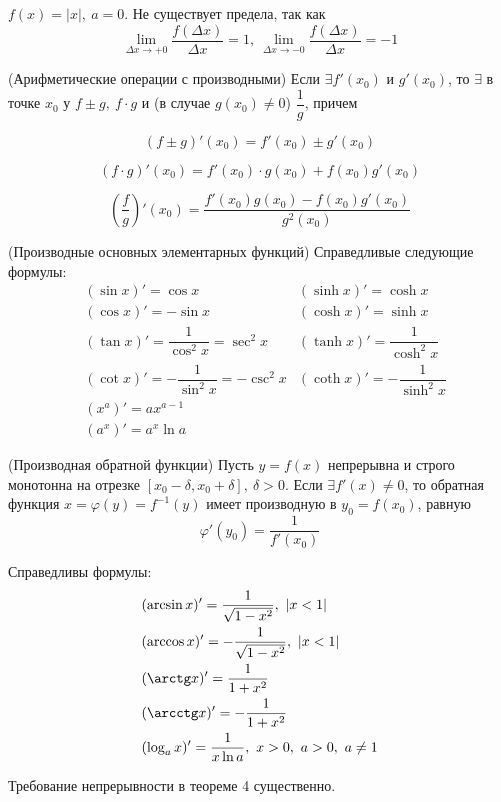 \begin{multicols}{2}
    \Ex $f(x) = |x|,\ a = 0$. Не существует предела, так как 
    \[
        \lim\limits_{\Delta x \to +0} \dfrac{f(\Delta x)}{\Delta x} = 1,\ \lim\limits_{\Delta x \to -0}\dfrac{f(\Delta x)}{\Delta x} = -1
    \]
    \begin{theorema}{(Арифметические операции с производными)}{} 
        Если $\exists f'(x_0)$ и  $g'(x_0)$, то $\exists$ в точке $x_0$ у $f\pm g,\ f\cdot g$ и (в случае $g(x_0) \neq 0$) $\dfrac{1}{g}$, причем 
        \begin{enumerate*}
            \item \[(f\pm g)'(x_0) = f'(x_0) \pm g'(x_0)\]
            \item \[(f\cdot g)'(x_0) = f'(x_0)\cdot g(x_0) + f(x_0)g'(x_0)\]
            \item \[(\dfrac{f}{g})'(x_0) = \dfrac{f'(x_0)g(x_0) - f(x_0)g'(x_0)}{g^2(x_0)}\]
        \end{enumerate*}
    \end{theorema}
    \begin{theorema}{(Производные основных элементарных функций)}{} 
        Справедливые следующие формулы:
        \begin{align*}
            &(\sin x)' = \cos x &(\sinh x)' = \cosh x\\ 
            &(\cos x)' = -\sin x &(\cosh x)' = \sinh x\\
            &(\tan x)' = \dfrac{1}{\cos^2 x} = \sec^2x &(\tanh x)' = \dfrac{1}{\cosh^2 x} \\
            &(\cot x)' = -\dfrac{1}{\sin^2x} = -\csc^2x &(\coth x)' = -\dfrac{1}{\sinh^2 x}\\
            &(x^a)' = ax^{a-1}\\&(a^x)' = a^x\ln a
        \end{align*}
    \end{theorema}
    \begin{theorema}{(Производная обратной функции)}{} Пусть $y = f(x)$ непрерывна и строго монотонна на отрезке $[x_0 - \delta , x_0 + \delta],\ \delta > 0$. Если $\exists f'(x) \neq 0$, то обратная функция $x = \varphi(y) = f^{-1}(y)$ имеет производную в $y_0 = f(x_0)$, равную \[
            \varphi'(y_0) = \dfrac{1}{f'(x_0)}
    \]
    \end{theorema}
    \begin{proposition}{}{}
        Справедливы формулы:
        \begin{align*}
            &(\arcsin x)' = \dfrac{1}{\sqrt{1-x^2}},\ |x < 1| \\&(\arccos x)' = -\dfrac{1}{\sqrt{1-x^2}},\ |x < 1|\\&(\arctg x)' = \dfrac{1}{1+x^2}\\&(\arcctg x)' = -\dfrac{1}{1+x^2}\\&(\log_a x)' = \dfrac{1}{x\ln a},\ x > 0,\ a > 0,\ a\neq 1
        \end{align*}
    \end{proposition}
    \begin{note}{}{} Требование непрерывности в теореме 4  существенно.
    \end{note}

\end{multicols}

